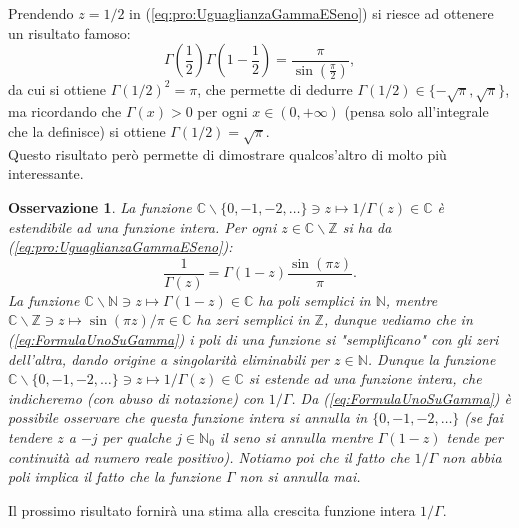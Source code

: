 \documentclass[11pt]{book}
\theoremstyle{Definizione}
\theoremstyle{TeoremaProposizioneLemmaCorollarioCongettura}
\theoremstyle{OsservazioneNotaEsempio}
\newtheorem{myobs}{Osservazione}[section]
\newcommand{\N}{\mathbb{N}}
\newcommand{\Z}{\mathbb{Z}}
\newcommand{\C}{\mathbb{C}}
\newcommand{\tolto}{\smallsetminus}
\begin{document}
\noindent
Prendendo $z = 1/2$ in (\ref{eq:pro:UguaglianzaGammaESeno}) si riesce ad ottenere un risultato famoso:
$$
\Gamma\left(\frac{1}{2}\right)\Gamma\left(1-\frac{1}{2}\right) = \frac{\pi}{\displaystyle\sin\left(\frac{\pi}{2}\right)},
$$
da cui si ottiene $\Gamma(1/2)^2 = \pi$, che permette di dedurre $\Gamma(1/2)\in \{-\sqrt{\pi},\sqrt{\pi}\}$, ma ricordando che $\Gamma(x) > 0$ per ogni $x\in (0,+\infty)$ (pensa solo all'integrale che la definisce) si ottiene $\Gamma(1/2) = \sqrt{\pi}$.\\
Questo risultato però permette di dimostrare qualcos'altro di molto più interessante.
\begin{myobs}
La funzione $\C\tolto \{0,-1,-2,\dots\} \ni z \longmapsto 1/\Gamma(z)\in \C$ è estendibile ad una funzione intera. Per ogni $z\in \C\tolto \Z$ si ha da (\ref{eq:pro:UguaglianzaGammaESeno}):
\begin{equation}\label{eq:FormulaUnoSuGamma}
\frac{1}{\Gamma(z)} = \Gamma(1-z) \frac{\sin(\pi z)}{\pi}.
\end{equation}
La funzione $\C\tolto \N \ni z \longmapsto \Gamma(1-z)\in \C$ ha poli semplici in $\N$, mentre $\C\tolto \Z \ni z \longmapsto \sin(\pi z)/\pi\in \C$ ha zeri semplici in $\Z$, dunque vediamo che in (\ref{eq:FormulaUnoSuGamma}) i poli di una funzione si "semplificano" con gli zeri dell'altra, dando origine a singolarità eliminabili per $z \in \N$. Dunque la funzione $\C\tolto \{0,-1,-2,\dots\}\ni z \longmapsto 1/\Gamma(z)\in \C$ si estende ad una funzione intera, che indicheremo (con abuso di notazione) con $1/\Gamma$. Da (\ref{eq:FormulaUnoSuGamma}) è possibile osservare che questa funzione intera si annulla in $\{0,-1,-2,\dots\}$ (se fai tendere $z$ a $-j$ per qualche $j\in \N_0$ il seno si annulla mentre $\Gamma(1-z)$ tende per continuità ad numero reale positivo). Notiamo poi che il fatto che $1/\Gamma$ non abbia poli implica il fatto che la funzione $\Gamma$ non si annulla mai.
\end{myobs}
Il prossimo risultato fornirà una stima alla crescita funzione intera $1/\Gamma$.
\end{document}
